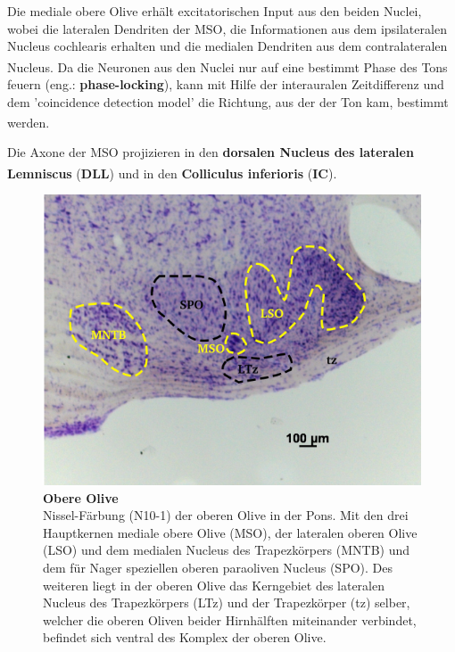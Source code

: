 \documentclass[12pt,a4paper,pdftex]{article}
\begin{document}
Die mediale obere Olive erhält excitatorischen Input aus den beiden Nuclei, wobei die lateralen Dendriten der MSO, die Informationen aus dem ipsilateralen Nucleus cochlearis erhalten und die medialen Dendriten aus dem contralateralen Nucleus\textsuperscript{\cite[29]{paxinos2014rat}}. Da die Neuronen aus den Nuclei nur auf eine bestimmt Phase des Tons feuern (eng.: \textbf{phase-locking}), kann mit Hilfe der interauralen Zeitdifferenz und dem 'coincidence detection model' die Richtung, aus der der Ton kam, bestimmt werden\textsuperscript{\cite[31]{kandel2013principles}}.

Die Axone der MSO projizieren in den \textbf{dorsalen Nucleus des lateralen Lemniscus} (\textbf{DLL}) und in den \textbf{Colliculus inferioris} (\textbf{IC})\textsuperscript{\cite[29]{paxinos2014rat}}.
\\

\begin{figure}[H]
    \centering
    \includegraphics{pictures/auditory/obere_olive.png}
    \caption[Obere Olive]{\textbf{Obere Olive}\\
    Nissel-Färbung (N10-1) der oberen Olive in der Pons. Mit den drei Hauptkernen mediale obere Olive (MSO), der lateralen oberen Olive (LSO) und dem medialen Nucleus des Trapezkörpers (MNTB) und dem für Nager speziellen oberen paraoliven Nucleus (SPO). Des weiteren liegt in der oberen Olive das Kerngebiet des lateralen Nucleus des Trapezkörpers (LTz) und der Trapezkörper (tz) selber, welcher die oberen Oliven beider Hirnhälften miteinander verbindet, befindet sich ventral des Komplex der oberen Olive.}
    \label{fig:obere_Olive}
\end{figure}
\end{document}

